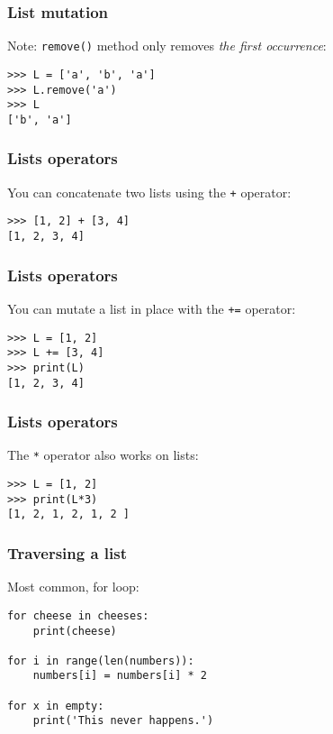 \begin{frame}[fragile]\frametitle{List mutation}

Note: \texttt{remove()} method only removes \textit{the first occurrence}:

\begin{lstlisting}
>>> L = ['a', 'b', 'a']
>>> L.remove('a')
>>> L
['b', 'a']
\end{lstlisting}

\end{frame}



\begin{frame}[fragile]\frametitle{Lists operators}
  You can concatenate two lists using the \texttt{+} operator:
  \begin{lstlisting}
>>> [1, 2] + [3, 4]
[1, 2, 3, 4]
  \end{lstlisting}
\end{frame}


\begin{frame}[fragile]\frametitle{Lists operators}
  You can mutate a list in place with the \texttt{+=} operator:
  \begin{lstlisting}
>>> L = [1, 2]
>>> L += [3, 4]
>>> print(L)
[1, 2, 3, 4]
  \end{lstlisting}
\end{frame}

\begin{frame}[fragile]\frametitle{Lists operators}
The \texttt{*} operator also works on lists:
  \begin{lstlisting}
>>> L = [1, 2]
>>> print(L*3)
[1, 2, 1, 2, 1, 2 ]
  \end{lstlisting}
\end{frame}

\begin{frame}[fragile]\frametitle{Traversing a list}
  Most common, for loop:
  \begin{lstlisting}
for cheese in cheeses:
    print(cheese)

for i in range(len(numbers)):
    numbers[i] = numbers[i] * 2
    
for x in empty:
	print('This never happens.')    
  \end{lstlisting}
\end{frame}



